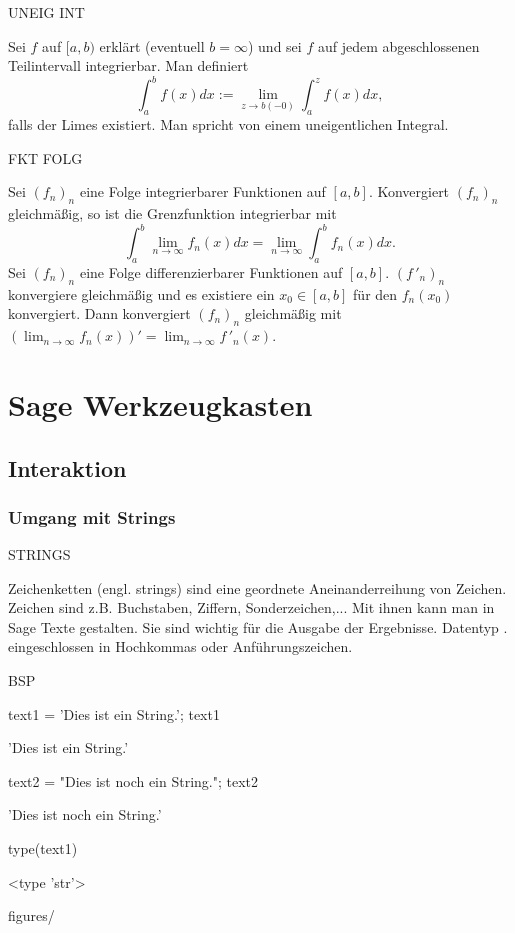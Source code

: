 \documentclass[fontsize=12pt,paper=a4,twoside,bibtotoc,idxtotoc,
liststotoc,pagesize,BCOR1.2cm,DIV15,chapterprefix,pagesize=pdftex]{scrbook}
\theoremstyle{plain}
\theoremstyle{definition}
\theoremstyle{remark}
\begin{document}
UNEIG INT

Sei $f$ auf $[a,b)$ erklärt (eventuell $b=\infty$) und sei $f$ auf jedem
abgeschlossenen Teilintervall integrierbar. Man definiert
\[  \int_a^b f(x)dx := \lim_{z \rightarrow b (-0)} \int_a^z f(x)dx,\]
falls der Limes existiert. Man spricht von einem {\color{red}
uneigentlichen Integral}.

FKT FOLG


 Sei $(f_n)_n$ eine Folge integrierbarer Funktionen auf
$[a,b]$. Konvergiert $(f_n)_n$ gleichmäßig, so ist die Grenzfunktion
integrierbar mit
\[ \int_a^b \lim_{n \rightarrow \infty} f_n(x) dx = \lim_{n
\rightarrow \infty} \int_a^b f_n(x) dx .\]
 Sei $(f_n)_n$ eine Folge differenzierbarer Funktionen auf
$[a,b]$. $(f\,'_n)_n$ konvergiere gleichmäßig und es existiere ein $x_0
\in [a,b]$ für den $f_n(x_0)$ konvergiert. Dann konvergiert $(f_n)_n$
gleichmäßig mit $( \lim_{n \rightarrow \infty} f_n(x))' = \lim_{n
\rightarrow \infty} f\,'_n(x)$.  


\chapter{Sage Werkzeugkasten}
\section{Interaktion}
\subsection{Umgang mit Strings}

STRINGS


 Zeichenketten (engl. {\color{red} strings}) sind eine geordnete
Aneinanderreihung von Zeichen. Zeichen sind z.B. Buchstaben, Ziffern,
Sonderzeichen,...
 Mit ihnen kann man in Sage Texte gestalten. Sie sind wichtig
für die Ausgabe der Ergebnisse.
 Datentyp .
 eingeschlossen in Hochkommas oder Anführungszeichen.


BSP

\begin{sagein}
text1 = 'Dies ist ein String.'; text1
\end{sagein}
\begin{sage}
'Dies ist ein String.'
\end{sage}
\begin{sagein}
text2 = "Dies ist noch ein String."; text2
\end{sagein}
\begin{sage}
'Dies ist noch ein String.'
\end{sage}
\begin{sagein}
type(text1)
\end{sagein}
\begin{sage}
<type 'str'>
\end{sage}figures/
\end{document}
